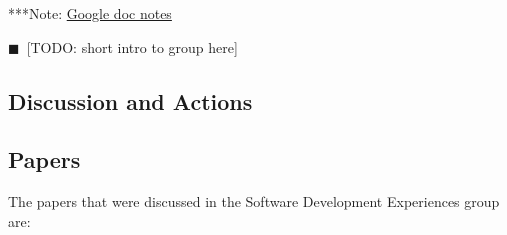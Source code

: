 \documentclass[11pt, oneside]{amsart}
\newcommand{\todo}[1]{{\color{blue}$\blacksquare$~\textsf{[TODO: #1]}}}
\newcommand{\note}[1]{ {\textcolor{blueish}    { ***Note:      #1 }}}
\begin{document}
\note{\href{http://tinyurl.com/pn4eq8z}{Google doc notes}}

\todo{short intro to group here}

\subsection{Discussion and Actions}

\subsection{Papers}
The papers that were discussed in the Software Development Experiences group are:
\end{document}
